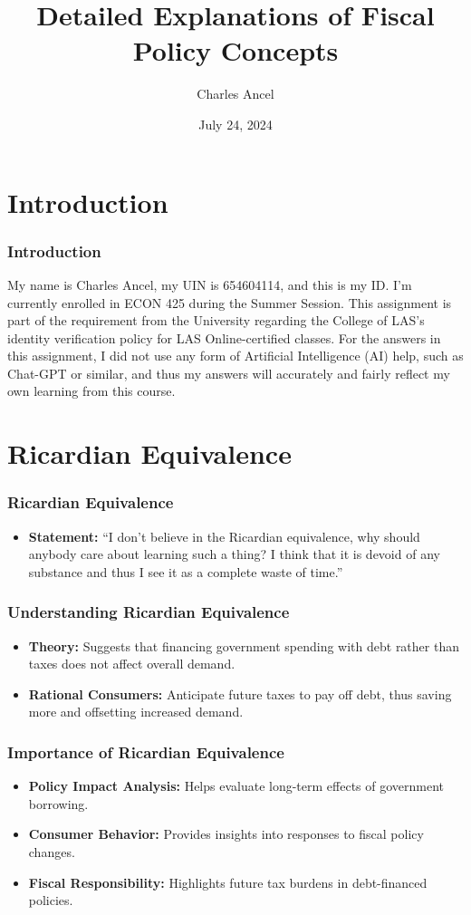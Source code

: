 \documentclass{beamer}
\title{Detailed Explanations of Fiscal Policy Concepts}
\author{Charles Ancel}
\date{July 24, 2024}
\begin{document}
\frame{\titlepage}

\section{Introduction}
\begin{frame}
    \frametitle{Introduction}
    My name is Charles Ancel, my UIN is 654604114, and this is my ID. I'm currently enrolled in ECON 425 during the Summer Session. This assignment is part of the requirement from the University regarding the College of LAS's identity verification policy for LAS Online-certified classes. For the answers in this assignment, I did not use any form of Artificial Intelligence (AI) help, such as Chat-GPT or similar, and thus my answers will accurately and fairly reflect my own learning from this course.
\end{frame}

\section{Ricardian Equivalence}

\begin{frame}
    \frametitle{Ricardian Equivalence}
    \begin{itemize}
        \item \textbf{Statement:} ``I don't believe in the Ricardian equivalence, why should anybody care about learning such a thing? I think that it is devoid of any substance and thus I see it as a complete waste of time.''
    \end{itemize}
\end{frame}

\begin{frame}
    \frametitle{Understanding Ricardian Equivalence}
    \begin{itemize}
        \item \textbf{Theory:} Suggests that financing government spending with debt rather than taxes does not affect overall demand.
        \item \textbf{Rational Consumers:} Anticipate future taxes to pay off debt, thus saving more and offsetting increased demand.
    \end{itemize}
\end{frame}

\begin{frame}
    \frametitle{Importance of Ricardian Equivalence}
    \begin{itemize}
        \item \textbf{Policy Impact Analysis:} Helps evaluate long-term effects of government borrowing.
        \item \textbf{Consumer Behavior:} Provides insights into responses to fiscal policy changes.
        \item \textbf{Fiscal Responsibility:} Highlights future tax burdens in debt-financed policies.
    \end{itemize}
\end{frame}
\end{document}
